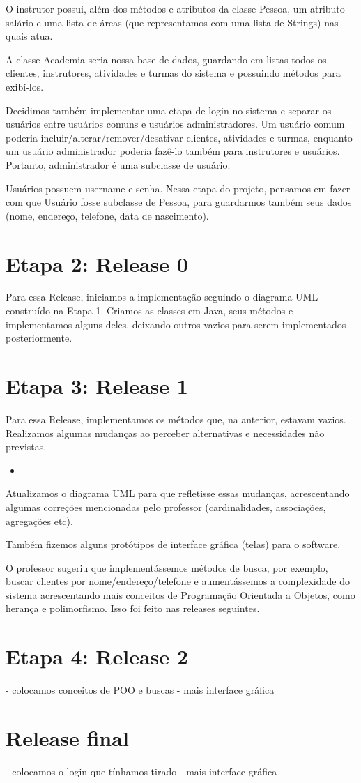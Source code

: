 \documentclass[11pt,twoside]{article}
\begin{document}
O instrutor possui, além dos métodos e atributos da classe Pessoa, um atributo salário e uma lista de áreas
(que representamos com uma lista de Strings) nas quais atua.

A classe Academia seria nossa base de dados, guardando em listas todos os clientes, instrutores, atividades e turmas do sistema
e possuindo métodos para exibí-los.

Decidimos também implementar uma etapa de login no sistema e separar os usuários entre usuários comuns e usuários administradores.
Um usuário comum poderia incluir/alterar/remover/desativar clientes, atividades e turmas, enquanto um usuário administrador
poderia fazê-lo também para instrutores e usuários. Portanto, administrador é uma subclasse de usuário.

Usuários possuem username e senha. Nessa etapa do projeto, pensamos em fazer com que Usuário fosse subclasse de Pessoa, para
guardarmos também seus dados (nome, endereço, telefone, data de nascimento).

\section{Etapa 2: Release 0}
Para essa Release, iniciamos a implementação seguindo o diagrama UML construído na Etapa 1. Criamos as classes em Java, seus métodos
e implementamos alguns deles, deixando outros vazios para serem implementados posteriormente.

\section{Etapa 3: Release 1}
Para essa Release, implementamos os métodos que, na anterior, estavam vazios. Realizamos algumas mudanças ao perceber alternativas
e necessidades não previstas.

\begin{itemize}
  \item
\end{itemize}


Atualizamos o diagrama UML para que refletisse essas mudanças, acrescentando algumas correções mencionadas
pelo professor (cardinalidades, associações, agregações etc).

Também fizemos alguns protótipos de interface gráfica (telas) para o software.

O professor sugeriu que implementássemos métodos de busca, por exemplo, buscar clientes por nome/endereço/telefone e
aumentássemos a complexidade do sistema acrescentando mais conceitos de Programação Orientada a Objetos, como herança e
polimorfismo. Isso foi feito nas releases seguintes.

\section{Etapa 4: Release 2}
- colocamos conceitos de POO e buscas
- mais interface gráfica
\section{Release final}
- colocamos o login que tínhamos tirado
- mais interface gráfica
\end{document}
